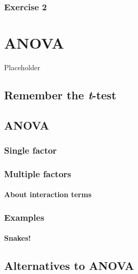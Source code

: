 \documentclass[english,10pt,a4paper,oneside]{book}
\begin{document}
\hypertarget{exercise-2}{%
\subsection{Exercise 2}\label{exercise-2}}

\hypertarget{anova}{%
\chapter{ANOVA}\label{anova}}

Placeholder

\hypertarget{remember-the-t-test}{%
\section{\texorpdfstring{Remember the \emph{t}-test}{Remember the t-test}}\label{remember-the-t-test}}

\hypertarget{anova-1}{%
\section{ANOVA}\label{anova-1}}

\hypertarget{single-factor}{%
\subsection{Single factor}\label{single-factor}}

\hypertarget{multiple-factors}{%
\subsection{Multiple factors}\label{multiple-factors}}

\hypertarget{about-interaction-terms}{%
\subsubsection{About interaction terms}\label{about-interaction-terms}}

\hypertarget{examples}{%
\subsection{Examples}\label{examples}}

\hypertarget{snakes}{%
\subsubsection{Snakes!}\label{snakes}}

\hypertarget{alternatives-to-anova}{%
\section{Alternatives to ANOVA}\label{alternatives-to-anova}}
\end{document}
